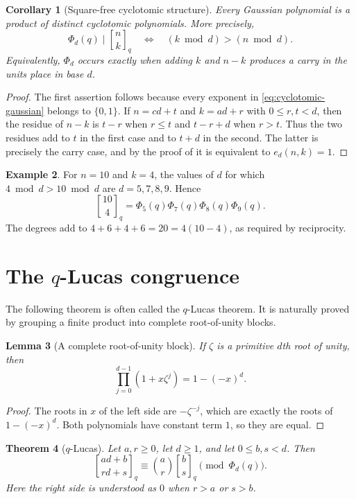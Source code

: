 \documentclass[11pt,oneside,openany]{book}
\newtheorem{theorem}{Theorem}[chapter]
\newtheorem{lemma}[theorem]{Lemma}
\newtheorem{corollary}[theorem]{Corollary}
\theoremstyle{definition}
\newtheorem{example}[theorem]{Example}
\theoremstyle{remark}
\newcommand{\qbinom}[2]{\genfrac{[}{]}{0pt}{}{#1}{#2}_{q}}
\newcommand{\Qbinom}[3]{\genfrac{[}{]}{0pt}{}{#1}{#2}_{#3}}
\begin{document}
\begin{corollary}[Square-free cyclotomic structure]\label{cor:squarefree-cyclotomic}
Every Gaussian polynomial is a product of distinct cyclotomic polynomials.  More precisely,
\[
 \Phi_d(q)\mid\qbinom nk
 \quad\Longleftrightarrow\quad
 (k\bmod d)> (n\bmod d).
 \tag{16.2}\label{eq:carry-criterion}
\]
Equivalently, $\Phi_d$ occurs exactly when adding $k$ and $n-k$ produces a carry in the units place in base $d$.
\end{corollary}

\begin{proof}
The first assertion follows because every exponent in \eqref{eq:cyclotomic-gaussian} belongs to $\{0,1\}$.  If $n=cd+t$ and $k=ad+r$ with $0\le r,t<d$, then the residue of $n-k$ is $t-r$ when $r\le t$ and $t-r+d$ when $r>t$.  Thus the two residues add to $t$ in the first case and to $t+d$ in the second.  The latter is precisely the carry case, and by the proof of  it is equivalent to $e_d(n,k)=1$.
\end{proof}

\begin{example}
For $n=10$ and $k=4$, the values of $d$ for which $4\bmod d>10\bmod d$ are $d=5,7,8,9$.  Hence
\[
 \qbinom{10}{4}=\Phi_5(q)\Phi_7(q)\Phi_8(q)\Phi_9(q).
\]
The degrees add to $4+6+4+6=20=4(10-4)$, as required by reciprocity.
\end{example}

\section{The \texorpdfstring{$q$}{q}-Lucas congruence}

The following theorem is often called the $q$-Lucas theorem.  It is naturally proved by grouping a finite product into complete root-of-unity blocks.

\begin{lemma}[A complete root-of-unity block]\label{lem:root-block}
If $\zeta$ is a primitive $d$th root of unity, then
\[
 \prod_{j=0}^{d-1}(1+x\zeta^j)=1-(-x)^d.
 \tag{16.3}\label{eq:root-block}
\]
\end{lemma}

\begin{proof}
The roots in $x$ of the left side are $-\zeta^{-j}$, which are exactly the roots of $1-(-x)^d$.  Both polynomials have constant term $1$, so they are equal.
\end{proof}

\begin{theorem}[$q$-Lucas]\label{thm:q-lucas}
Let $a,r\ge0$, let $d\ge1$, and let $0\le b,s<d$.  Then
\[
 \Qbinom{ad+b}{rd+s}{q}
 \equiv
 \binom ar\Qbinom bsq
 \pmod{\Phi_d(q)}.
 \tag{16.4}\label{eq:q-lucas}
\]
Here the right side is understood as $0$ when $r>a$ or $s>b$.
\end{theorem}
\end{document}
